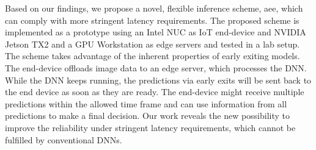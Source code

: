 \begin{justify}
\begin{small}
{{		Based on our findings, we propose a novel, flexible inference scheme, \acrfull{aee}, which can comply with more stringent latency requirements. The proposed scheme is implemented as a prototype using an Intel NUC as IoT end-device and NVIDIA Jetson TX2 and a GPU Workstation as edge servers and tested in a lab setup. The scheme takes advantage of the inherent properties of early exiting models. The end-device offloads image data to an edge server, which processes the DNN. While the DNN keeps running, the predictions via early exits will be sent back to the end device as soon as they are ready. The end-device might receive multiple predictions within the allowed time frame and can use information from all predictions to make a final decision. Our work reveals the new possibility to improve the reliability under stringent latency requirements, which cannot be fulfilled by conventional DNNs.
		}}
	\end{small}
\end{justify}
    